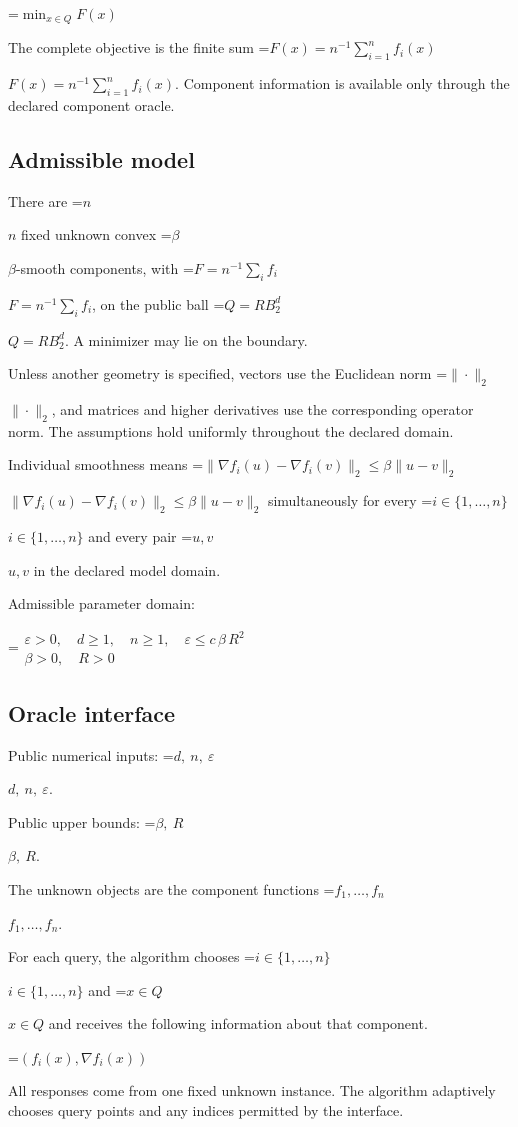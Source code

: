 \documentclass[10pt,a4paper]{article}
\newcommand{\AtlasMath}[1]{\par\begingroup\centering\setbox0=\hbox{$\displaystyle #1$}\ifdim\wd0>1.4\linewidth\typeout{ATLAS WIDE FORMULA: \the\wd0}\fi\ifdim\wd0>\linewidth\resizebox{\linewidth}{!}{\box0}\else\box0\fi\par\endgroup}
\newcommand{\AtlasInlineMath}[1]{\begingroup\setbox0=\hbox{$#1$}\ifdim\wd0>.4\linewidth\endgroup\AtlasMath{#1}\else\endgroup$#1$\fi}
\begin{document}
\AtlasMath{\min_{x\in Q}F(x)}


The complete objective is the finite sum \AtlasInlineMath{F(x)=n^{-1}\sum_{i=1}^n f_i(x)}. Component information is available only through the declared component oracle.

\subsection{Admissible model}
There are \AtlasInlineMath{n} fixed unknown convex \AtlasInlineMath{\beta}-smooth components, with \AtlasInlineMath{F=n^{-1}\sum_i f_i}, on the public ball \AtlasInlineMath{Q=RB_2^d}. A minimizer may lie on the boundary.

Unless another geometry is specified, vectors use the Euclidean norm \AtlasInlineMath{\|\cdot\|_2}, and matrices and higher derivatives use the corresponding operator norm. The assumptions hold uniformly throughout the declared domain.

Individual smoothness means \AtlasInlineMath{\|\nabla f_i(u)-\nabla f_i(v)\|_2\le\beta\|u-v\|_2} simultaneously for every \AtlasInlineMath{i\in\{1,\ldots,n\}} and every pair \AtlasInlineMath{u,v} in the declared model domain.

Admissible parameter domain:


\AtlasMath{\begin{gathered}\varepsilon > 0,\quad d \ge 1,\quad n \ge 1,\quad \varepsilon \le c\,\beta\,{R}^{2}\\\beta > 0,\quad R > 0\end{gathered}}


\subsection{Oracle interface}
Public numerical inputs: \AtlasInlineMath{d,\ n,\ \varepsilon}.

Public upper bounds: \AtlasInlineMath{\beta,\ R}.

The unknown objects are the component functions \AtlasInlineMath{f_1,\ldots,f_n}.

For each query, the algorithm chooses \AtlasInlineMath{i\in\{1,\ldots,n\}} and \AtlasInlineMath{x\in Q} and receives the following information about that component.


\AtlasMath{(f_i(x),\nabla f_i(x))}


All responses come from one fixed unknown instance. The algorithm adaptively chooses query points and any indices permitted by the interface.
\end{document}
